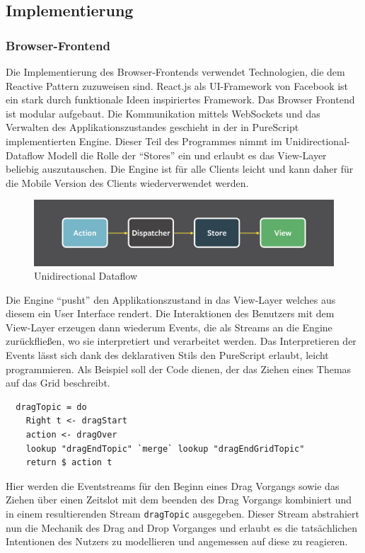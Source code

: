 \subsection{Implementierung}
\subsubsection{Browser-Frontend}
Die Implementierung des Browser-Frontends verwendet Technologien, die dem Reactive Pattern zuzuweisen sind.
React.js als UI-Framework von Facebook ist ein stark durch funktionale
Ideen inspiriertes Framework. Das Browser Frontend ist modular
aufgebaut. Die Kommunikation mittels WebSockets und das Verwalten des
Applikationszustandes geschieht in der in PureScript implementierten
Engine. Dieser Teil des Programmes  nimmt im Unidirectional-Dataflow
Modell die Rolle der ``Stores'' ein und erlaubt es das View-Layer
beliebig auszutauschen. Die Engine ist für alle Clients leicht und
kann daher für die Mobile Version des Clients wiederverwendet werden.
\begin{figure}[h]
\includegraphics[scale=0.3]{img/Unidirectional.png}
\caption{Unidirectional Dataflow}
\end{figure}

\noindent Die Engine ``pusht'' den Applikationszustand in das
View-Layer welches aus diesem ein User Interface rendert.
Die Interaktionen des Benutzers mit dem View-Layer erzeugen dann
wiederum Events, die als Streams an die Engine zurückfließen, wo sie
interpretiert und verarbeitet werden. Das Interpretieren der Events
lässt sich dank des deklarativen Stils den PureScript erlaubt, leicht
programmieren. Als Beispiel soll der Code dienen, der das Ziehen eines
Themas auf das Grid beschreibt.

\begin{lstlisting}
  dragTopic = do
    Right t <- dragStart
    action <- dragOver
    lookup "dragEndTopic" `merge` lookup "dragEndGridTopic"
    return $ action t
\end{lstlisting}

\noindent Hier werden die Eventstreams für den Beginn eines Drag Vorgangs sowie
das Ziehen über einen Zeitslot mit dem beenden des Drag Vorgangs
kombiniert und in einem resultierenden Stream \texttt{dragTopic}
ausgegeben. Dieser Stream abstrahiert nun die Mechanik des Drag and
Drop Vorganges und erlaubt es die tatsächlichen Intentionen des
Nutzers zu modellieren und angemessen auf diese zu reagieren.

